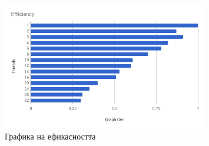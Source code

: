 \begin{figure}[h]
  \centering
  \includegraphics[width=0.8\textwidth]{resources/efficiency.png}
  \caption{\label{fig::efficiency} Графика на ефикасността }
\end{figure}
